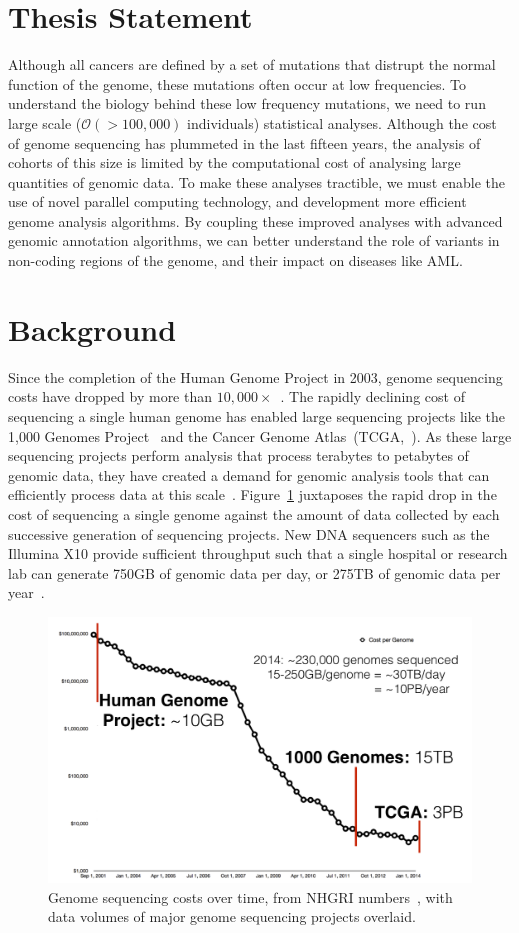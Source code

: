 \documentclass[11pt]{article} %
\begin{document}
\section{Thesis Statement}

Although all cancers are defined by a set of mutations that distrupt the normal function
of the genome, these mutations often occur at low frequencies. To understand the biology
behind these low frequency mutations, we need to run large scale ($\mathcal{O}(>100,000)$
individuals) statistical analyses. Although the cost of genome sequencing has plummeted
in the last fifteen years, the analysis of cohorts of this size is limited by the computational
cost of analysing large quantities of genomic data. To make these analyses tractible, we
must enable the use of novel parallel computing technology, and development more efficient
genome analysis algorithms. By coupling these improved analyses with advanced genomic
annotation algorithms, we can better understand the role of variants in non-coding regions
of the genome, and their impact on diseases like AML.

\section{Background}

Since the completion of the Human Genome Project in 2003, genome sequencing costs have dropped
by more than $10,000\times$~\cite{nhgri}. The rapidly declining cost of sequencing a single human
genome has enabled large sequencing projects like the 1,000 Genomes Project~\cite{siva08} and
the Cancer Genome Atlas~(TCGA,~\cite{weinstein13}). As these large sequencing projects perform
analysis that process terabytes to petabytes of genomic data, they have created a demand
for genomic analysis tools that can efficiently process data at this
scale~\cite{schadt10, stein10}. Figure~\ref{fig:sequencing-costs} juxtaposes the rapid drop
in the cost of sequencing a single genome against the amount of data collected by each successive
generation of sequencing projects. New DNA sequencers such as the Illumina X10 provide
sufficient throughput such that a single hospital or research lab can generate 750GB of genomic
data per day, or 275TB of genomic data per year~\cite{illumina-x10}.

\begin{figure}[h]
\begin{center}
\includegraphics[width=0.6\linewidth]{genome-sequencing.pdf}
\caption{Genome sequencing costs over time, from NHGRI numbers~\cite{nhgri}, with
data volumes of major genome sequencing projects overlaid.}
\label{fig:sequencing-costs}
\end{center}
\end{figure}
\end{document}
